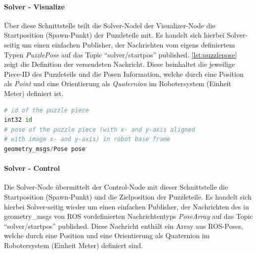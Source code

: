 \paragraph{Solver - Visualize}
Über diese Schnittstelle teilt die Solver-Nodel der Visualizer-Node die Startposition (Spawn-Punkt) der Puzzleteile mit. Es handelt sich hierbei Solver-seitig um einen einfachen Publisher, der Nachrichten vom eigens definiertem Typen \textit{PuzzlePose} auf das Topic ``solver/startpos'' published. \autoref{lst:puzzlepose} zeigt die Definition der versendeten Nachricht. Diese beinhaltet die jeweilige Piece-ID des Puzzleteils und die Posen Information, welche durch eine Position als \textit{Point} und eine Orientierung als \textit{Quaternion} im Robotersystem (Einheit Meter) definiert ist.
\begin{lstlisting}[language=Python, caption={Nachrichten Definition für     PuzzlePose.msg},label=lst:puzzlepose]
# id of the puzzle piece
int32 id
# pose of the puzzle piece (with x- and y-axis aligned 
# with image x- and y-axis) in robot base frame
geometry_msgs/Pose pose 

\end{lstlisting}

\paragraph{Solver - Control}
Die Solver-Node übermittelt der Control-Node mit dieser Schnittstelle die Startposition (Spawn-Punkt) und die Zielposition der Puzzleteile. Es handelt sich hierbei Solver-seitig wieder um einen einfachen Publisher, der Nachrichten des in geometry\_msgs von ROS vordefinierten Nachrichtentyps  \textit{PoseArray} auf das Topic ``solver/startpos'' published. Diese Nachricht enthält ein Array aus ROS-Poses, welche durch eine Position und eine Orientierung als Quaternion im Robotersystem (Einheit Meter) definiert sind.
 
